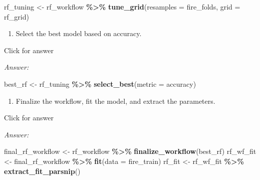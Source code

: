 \documentclass[
]{book}
\newenvironment{Shaded}{\begin{snugshade}}{\end{snugshade}}
\newcommand{\AttributeTok}[1]{\textcolor[rgb]{0.13,0.29,0.53}{#1}}
\newcommand{\FunctionTok}[1]{\textcolor[rgb]{0.13,0.29,0.53}{\textbf{#1}}}
\newcommand{\NormalTok}[1]{#1}
\newcommand{\OtherTok}[1]{\textcolor[rgb]{0.56,0.35,0.01}{#1}}
\newcommand{\SpecialCharTok}[1]{\textcolor[rgb]{0.81,0.36,0.00}{\textbf{#1}}}
\newcommand{\StringTok}[1]{\textcolor[rgb]{0.31,0.60,0.02}{#1}}
\providecommand{\tightlist}{%
  \setlength{\itemsep}{0pt}\setlength{\parskip}{0pt}}
\begin{document}
\begin{Shaded}
\begin{Highlighting}[]
\NormalTok{rf\_tuning }\OtherTok{\textless{}{-}}\NormalTok{ rf\_workflow }\SpecialCharTok{\%\textgreater{}\%} 
             \FunctionTok{tune\_grid}\NormalTok{(}\AttributeTok{resamples =}\NormalTok{ fire\_folds,}
                       \AttributeTok{grid =}\NormalTok{ rf\_grid)}
\end{Highlighting}
\end{Shaded}

\begin{enumerate}
\def\labelenumi{\alph{enumi}.}
\setcounter{enumi}{4}
\tightlist
\item
  Select the best model based on accuracy.
\end{enumerate}

Click for answer

\emph{Answer:}

\begin{Shaded}
\begin{Highlighting}[]
\NormalTok{best\_rf }\OtherTok{\textless{}{-}}\NormalTok{ rf\_tuning }\SpecialCharTok{\%\textgreater{}\%} 
           \FunctionTok{select\_best}\NormalTok{(}\AttributeTok{metric =} \StringTok{\textquotesingle{}accuracy\textquotesingle{}}\NormalTok{)}
\end{Highlighting}
\end{Shaded}

\begin{enumerate}
\def\labelenumi{\alph{enumi}.}
\setcounter{enumi}{5}
\tightlist
\item
  Finalize the workflow, fit the model, and extract the parameters.
\end{enumerate}

Click for answer

\emph{Answer:}

\begin{Shaded}
\begin{Highlighting}[]
\NormalTok{final\_rf\_workflow }\OtherTok{\textless{}{-}}\NormalTok{ rf\_workflow }\SpecialCharTok{\%\textgreater{}\%} 
                     \FunctionTok{finalize\_workflow}\NormalTok{(best\_rf)}
\NormalTok{rf\_wf\_fit }\OtherTok{\textless{}{-}}\NormalTok{ final\_rf\_workflow }\SpecialCharTok{\%\textgreater{}\%} 
             \FunctionTok{fit}\NormalTok{(}\AttributeTok{data =}\NormalTok{ fire\_train)}
\NormalTok{rf\_fit }\OtherTok{\textless{}{-}}\NormalTok{ rf\_wf\_fit }\SpecialCharTok{\%\textgreater{}\%} 
          \FunctionTok{extract\_fit\_parsnip}\NormalTok{()}
\end{Highlighting}
\end{Shaded}
\end{document}
